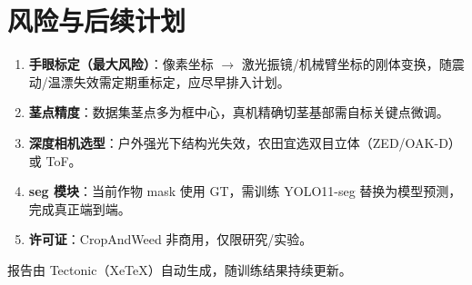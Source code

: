 \documentclass[11pt,a4paper]{article}
\begin{document}
\section{风险与后续计划}

\begin{enumerate}[label=\textbf{(\arabic*)}]
  \item \textbf{手眼标定（最大风险）}：像素坐标 $\to$ 激光振镜/机械臂坐标的刚体变换，随震动/温漂失效需定期重标定，应尽早排入计划。
  \item \textbf{茎点精度}：数据集茎点多为框中心，真机精确切茎基部需自标关键点微调。
  \item \textbf{深度相机选型}：户外强光下结构光失效，农田宜选双目立体（ZED/OAK-D）或 ToF。
  \item \textbf{seg 模块}：当前作物 mask 使用 GT，需训练 YOLO11-seg 替换为模型预测，完成真正端到端。
  \item \textbf{许可证}：CropAndWeed 非商用，仅限研究/实验。
\end{enumerate}

\vfill
\begin{center}
\small 报告由 Tectonic（XeTeX）自动生成，随训练结果持续更新。
\end{center}
\end{document}
